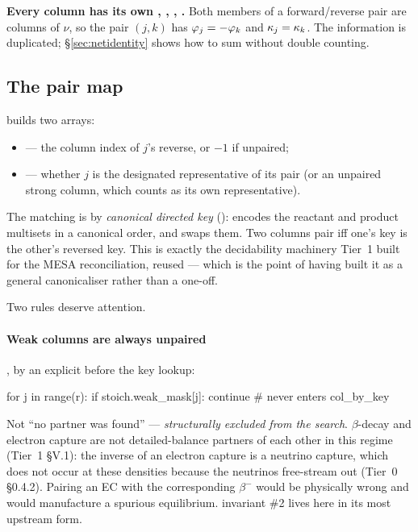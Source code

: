 \textbf{Every column has its own \fp, \fm, \netflux, \kap.} Both members of a
forward/reverse pair are columns of $\nu$, so the pair $(j, k)$ has
$\varphi_j = -\varphi_k$ and $\kappa_j = \kappa_k$. The information is duplicated;
\S\ref{sec:netidentity} shows how to sum without double counting.

\subsection{The pair map}
\label{sec:pairmap}

 builds two arrays:

\begin{itemize}
\item {} --- the column index of $j$'s reverse, or $-1$ if
  unpaired;
\item {} --- whether $j$ is the designated
  representative of its pair (or an unpaired strong column, which counts as its
  own representative).
\end{itemize}

The matching is by \emph{canonical directed key} ():
 encodes the reactant and product multisets in a
canonical order, and  swaps them. Two columns pair iff one's
key is the other's reversed key. This is exactly the decidability machinery
Tier~1 built for the MESA reconciliation, reused --- which is the point of
having built it as a general canonicaliser rather than a one-off.

Two rules deserve attention.

\paragraph{Weak columns are always unpaired}, by an explicit 
before the key lookup:

\begin{srclisting}
for j in range(r):
    if stoich.weak_mask[j]:
        continue                      # never enters col_by_key
\end{srclisting}

Not ``no partner was found'' --- \emph{structurally excluded from the search}.
$\beta$-decay and electron capture are not detailed-balance partners of each
other in this regime (Tier~1 \S V.1): the inverse of an electron capture is a
neutrino capture, which does not occur at these densities because the neutrinos
free-stream out (Tier~0 \S0.4.2). Pairing an EC with the corresponding
$\beta^-$ would be physically wrong and would manufacture a spurious
equilibrium.  invariant \#2 lives here in its most upstream
form.

